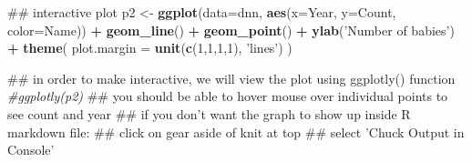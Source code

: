 \documentclass[]{article}
\newenvironment{Shaded}{\begin{snugshade}}{\end{snugshade}}
\newcommand{\KeywordTok}[1]{\textcolor[rgb]{0.13,0.29,0.53}{\textbf{#1}}}
\newcommand{\DataTypeTok}[1]{\textcolor[rgb]{0.13,0.29,0.53}{#1}}
\newcommand{\DecValTok}[1]{\textcolor[rgb]{0.00,0.00,0.81}{#1}}
\newcommand{\StringTok}[1]{\textcolor[rgb]{0.31,0.60,0.02}{#1}}
\newcommand{\CommentTok}[1]{\textcolor[rgb]{0.56,0.35,0.01}{\textit{#1}}}
\newcommand{\OperatorTok}[1]{\textcolor[rgb]{0.81,0.36,0.00}{\textbf{#1}}}
\newcommand{\NormalTok}[1]{#1}
\begin{document}
\begin{Shaded}
\begin{Highlighting}[]
\NormalTok{## interactive plot}
\NormalTok{p2 <-}\StringTok{ }\KeywordTok{ggplot}\NormalTok{(}\DataTypeTok{data=}\NormalTok{dnn, }\KeywordTok{aes}\NormalTok{(}\DataTypeTok{x=}\NormalTok{Year, }\DataTypeTok{y=}\NormalTok{Count, }\DataTypeTok{color=}\NormalTok{Name)) }\OperatorTok{+}\StringTok{ }
\StringTok{  }\KeywordTok{geom_line}\NormalTok{() }\OperatorTok{+}\StringTok{ }
\StringTok{  }\KeywordTok{geom_point}\NormalTok{() }\OperatorTok{+}\StringTok{ }
\StringTok{  }\KeywordTok{ylab}\NormalTok{(}\StringTok{'Number of babies'}\NormalTok{) }\OperatorTok{+}\StringTok{ }
\StringTok{  }\KeywordTok{theme}\NormalTok{(}
    \DataTypeTok{plot.margin =} \KeywordTok{unit}\NormalTok{(}\KeywordTok{c}\NormalTok{(}\DecValTok{1}\NormalTok{,}\DecValTok{1}\NormalTok{,}\DecValTok{1}\NormalTok{,}\DecValTok{1}\NormalTok{), }\StringTok{'lines'}\NormalTok{)}
\NormalTok{  )}

\NormalTok{## in order to make interactive, we will view the plot using ggplotly() function}
\CommentTok{#ggplotly(p2)}
\NormalTok{## you should be able to hover mouse over individual points to see count and year}
\NormalTok{## if you don't want the graph to show up inside R markdown file:}
\NormalTok{    ## click on gear aside of knit at top}
\NormalTok{    ## select 'Chuck Output in Console'}
\end{Highlighting}
\end{Shaded}
\end{document}

